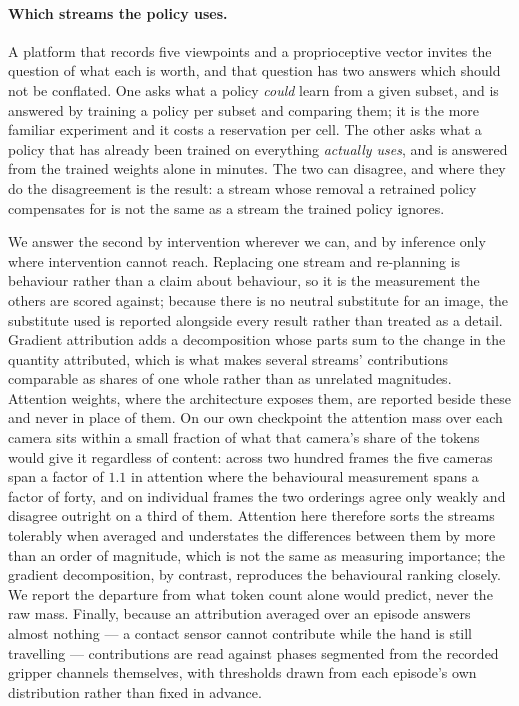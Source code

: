 \paragraph{Which streams the policy uses.} A platform that records five
viewpoints and a proprioceptive vector invites the question of what each is
worth, and that question has two answers which should not be conflated. One
asks what a policy \emph{could} learn from a given subset, and is answered by
training a policy per subset and comparing them; it is the more familiar
experiment and it costs a reservation per cell. The other asks what a policy
that has already been trained on everything \emph{actually uses}, and is
answered from the trained weights alone in minutes. The two can disagree, and
where they do the disagreement is the result: a stream whose removal a
retrained policy compensates for is not the same as a stream the trained policy
ignores.

We answer the second by intervention wherever we can, and by inference only
where intervention cannot reach. Replacing one stream and re-planning is
behaviour rather than a claim about behaviour, so it is the measurement the
others are scored against; because there is no neutral substitute for an image,
the substitute used is reported alongside every result rather than treated as a
detail. Gradient attribution adds a decomposition whose parts sum to the change
in the quantity attributed, which is what makes several streams' contributions
comparable as shares of one whole rather than as unrelated magnitudes. Attention
weights, where the architecture exposes them, are reported beside these and
never in place of them. On our own checkpoint the attention mass over each
camera sits within a small fraction of what that camera's share of the tokens
would give it regardless of content: across two hundred frames the five cameras
span a factor of $1.1$ in attention where the behavioural measurement spans a
factor of forty, and on individual frames the two orderings agree only weakly
and disagree outright on a third of them. Attention here therefore sorts the
streams tolerably when averaged and understates the differences between them by
more than an order of magnitude, which is not the same as measuring importance;
the gradient decomposition, by contrast, reproduces the behavioural ranking
closely. We report the departure from what token count alone would predict,
never the raw mass. Finally, because an attribution averaged over an episode answers
almost nothing --- a contact sensor cannot contribute while the hand is still
travelling --- contributions are read against phases segmented from the
recorded gripper channels themselves, with thresholds drawn from each episode's
own distribution rather than fixed in advance.
